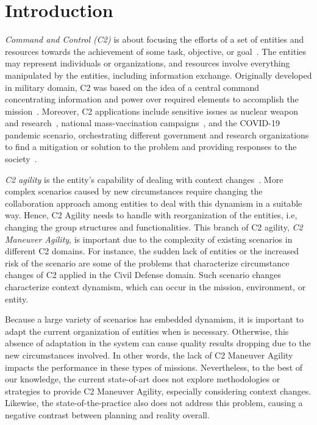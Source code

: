 \section{Introduction}
\label{sec:introduction}


\textit{Command and Control (C2)} is about focusing the efforts of a set of entities and resources towards the achievement of some task, objective, or goal~\citep{CC02}. The entities may represent individuals or organizations, and resources involve everything manipulated by the entities, including information exchange. Originally developed in military domain, C2 was based on the idea of a central command concentrating information and power over required elements to accomplish the mission~\citep{CC01}. Moreover, C2 applications include sensitive issues as nuclear weapon and research~\citep{C2-EX2}, national mass-vaccination campaigns~\citep{C2-EX1}, and the COVID-19 pandemic scenario, orchestrating different government and research organizations to find a mitigation or solution to the problem and providing responses to the society~\citep{C2-EX3, C2-EX4, C2-EX5}.


\textit{C2 agility} is the entity's capability of dealing with context changes~\citep{france2014}. More complex scenarios caused by new circumstances require changing the collaboration approach among entities to deal with this dynamism in a suitable way. Hence, C2 Agility needs to handle with reorganization of the entities, i.e, changing the group structures and functionalities. This branch of C2 agility, \textit{C2 Maneuver Agility}, is important due to the complexity of existing scenarios in different C2 domains. For instance, the sudden lack of entities or the increased risk of the scenario are some of the problems that characterize circumstance changes of C2 applied in the Civil Defense domain. Such scenario changes characterize context dynamism, which can occur in the mission, environment, or entity.


Because a large variety of scenarios has embedded dynamism, it is important to adapt the current organization of entities when is necessary. Otherwise, this absence of adaptation in the system can cause quality results dropping due to the new circumstances involved. In other words, the lack of C2 Maneuver Agility impacts the performance in these types of missions. Nevertheless, to the best of our knowledge, the current state-of-art does not explore methodologies or strategies to provide C2 Maneuver Agility, especially considering context changes. Likewise, the state-of-the-practice also does not address this problem, causing a negative contrast between planning and reality overall.

